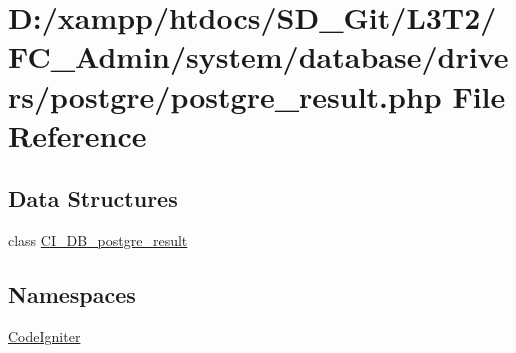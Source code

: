 \hypertarget{postgre__result_8php}{}\section{D\+:/xampp/htdocs/\+S\+D\+\_\+\+Git/\+L3\+T2/\+F\+C\+\_\+\+Admin/system/database/drivers/postgre/postgre\+\_\+result.php File Reference}
\label{postgre__result_8php}
\subsection*{Data Structures}
\begin{DoxyCompactItemize}
\item 
class \hyperlink{class_c_i___d_b__postgre__result}{C\+I\+\_\+\+D\+B\+\_\+postgre\+\_\+result}
\end{DoxyCompactItemize}
\subsection*{Namespaces}
\begin{DoxyCompactItemize}
\item 
 \hyperlink{namespace_code_igniter}{Code\+Igniter}
\end{DoxyCompactItemize}
